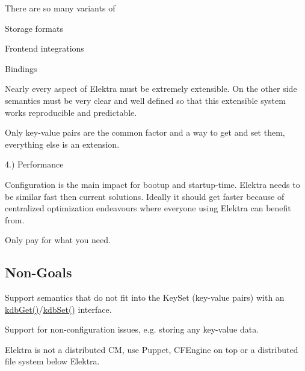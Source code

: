 There are so many variants of


\begin{DoxyItemize}
\item Storage formats
\item Frontend integrations
\item Bindings
\end{DoxyItemize}

Nearly every aspect of Elektra must be extremely extensible. On the other side semantics must be very clear and well defined so that this extensible system works reproducible and predictable.

Only key-\/value pairs are the common factor and a way to get and set them, everything else is an extension.

4.) Performance

Configuration is the main impact for bootup and startup-\/time. Elektra needs to be similar fast then current solutions. Ideally it should get faster because of centralized optimization endeavours where everyone using Elektra can benefit from.

Only pay for what you need.

\subsection*{Non-\/\+Goals}


\begin{DoxyItemize}
\item Support semantics that do not fit into the Key\+Set (key-\/value pairs) with an {\ttfamily \hyperlink{group__kdb_ga28e385fd9cb7ccfe0b2f1ed2f62453a1}{kdb\+Get()}}/{\ttfamily \hyperlink{group__kdb_ga11436b058408f83d303ca5e996832bcf}{kdb\+Set()}} interface.
\item Support for non-\/configuration issues, e.\+g. storing any key-\/value data.
\item Elektra is not a distributed CM, use Puppet, C\+F\+Engine on top or a distributed file system below Elektra. 
\end{DoxyItemize}